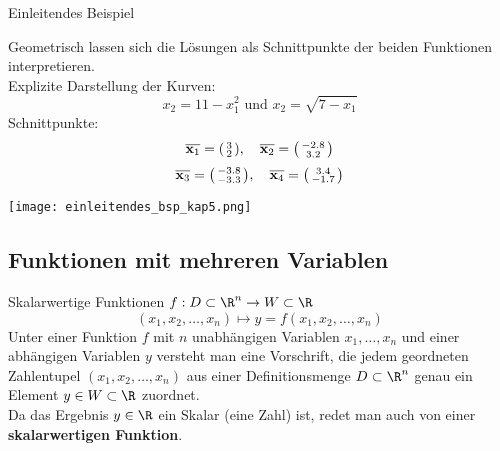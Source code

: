 \begin{example2}{Einleitendes Beispiel}
    \begin{minipage}{0.59\linewidth}
    Geometrisch lassen sich die Lösungen als Schnittpunkte der beiden Funktionen interpretieren.\\
    Explizite Darstellung der Kurven:
    \vspace{-2mm}
    $$x_2 = 11 - x_1^2 \text{ und } x_2 = \sqrt{7 - x_1}$$
    Schnittpunkte:
    \vspace{-2mm}
    $$\overline{\textbf{x}_1} = \begin{psmallmatrix} 3 \\ 2 \end{psmallmatrix}, \quad \overline{\textbf{x}_2} = \begin{psmallmatrix} -2.8 \\ 3.2 \end{psmallmatrix}$$
    $$\overline{\textbf{x}_3} = \begin{psmallmatrix} -3.8 \\ -3.3 \end{psmallmatrix}, \quad \overline{\textbf{x}_4} = \begin{psmallmatrix} 3.4 \\ -1.7 \end{psmallmatrix}$$
    \end{minipage}
    \begin{minipage}{0.4\linewidth}
    \texttt{[image: einleitendes\_bsp\_kap5.png]}
    \end{minipage}
\end{example2}

\raggedcolumns

\subsection{Funktionen mit mehreren Variablen}

\begin{definition}{Skalarwertige Funktionen}
    $f: D \subset \R^n \to W \subset \R$
    \vspace{-2mm}
    $$(x_1, x_2, \ldots, x_n) \mapsto y = f(x_1, x_2, \ldots, x_n)$$
    Unter einer Funktion $f$ mit $n$ unabhängigen Variablen $x_1, \ldots, x_n$ und einer abhängigen Variablen $y$ versteht man eine Vorschrift, 
    die jedem geordneten Zahlentupel $(x_1, x_2, \ldots, x_n)$ aus einer Definitionsmenge $D \subset \R^n$ genau ein Element $y \in W \subset \R$ zuordnet.
    \vspace{2mm} \\
    Da das Ergebnis $y \in \R$ ein Skalar (eine Zahl) ist, redet man auch von einer \textbf{skalarwertigen Funktion}.
\end{definition}

